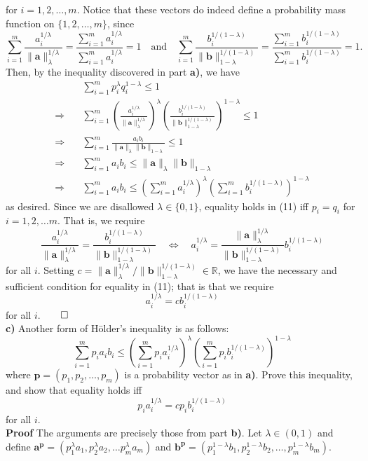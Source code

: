 \documentclass[11pt, letterpaper]{article}
\newcommand{\bs}[1]{\boldsymbol{#1}}
\newcommand{\mbb}[1]{\mathbb{#1}}
\begin{document}
for $i=1,2,\dots,m$. Notice that these vectors do indeed define a probability mass function on $\{1,2,\dots,m\}$, since
\[\sum_{i=1}^m\frac{a_i^{1/\lambda}}{\|\bs{a}\|_\lambda^{1/\lambda}}=\frac{\sum_{i=1}^ma_i^{1/\lambda}}{\sum_{i=1}^ma_i^{1/\lambda}}=1\quad\text{and}\quad\sum_{i=1}^m\frac{b_i^{1/(1-\lambda)}}{\|\bs{b}\|_{1-\lambda}^{1/(1-\lambda)}}=\frac{\sum_{i=1}^mb_i^{1/(1-\lambda)}}{\sum_{i=1}^mb_i^{1/(1-\lambda)}}=1.\]
Then, by the inequality discovered in part {\bf a)}, we have
\begin{align*}
    &\sum_{i=1}^mp_i^\lambda q_i^{1-\lambda}\leq 1\\
    \Rightarrow\quad&\sum_{i=1}^m\left(\frac{a_i^{1/\lambda}}{\|\bs{a}\|_\lambda^{1/\lambda}}\right)^\lambda\left(\frac{b_i^{1/(1-\lambda)}}{\|\bs{b}\|_{1-\lambda}^{1/(1-\lambda)}}\right)^{1-\lambda}\leq 1\\
    \Rightarrow\quad&\sum_{i=1}^m\frac{a_ib_i}{\|\bs{a}\|_\lambda\|\bs{b}\|_{1-\lambda}}\leq 1\\
    \Rightarrow\quad&\sum_{i=1}^ma_ib_i\leq\|\bs{a}\|_\lambda\|\bs{b}\|_{1-\lambda}\\
    \Rightarrow\quad&\sum_{i=1}^ma_ib_i\leq\left(\sum_{i=1}^ma_i^{1/\lambda}\right)^{\lambda}\left(\sum_{i=1}^mb_i^{1/(1-\lambda)}\right)^{1-\lambda}\tag{11}
\end{align*}
as desired. Since we are disallowed $\lambda\in\{0,1\}$, equality holds in (11) iff $p_i=q_i$ for $i=1,2,\dots m$. That is, we require
\[\frac{a_i^{1/\lambda}}{\|\bs{a}\|_\lambda^{1/\lambda}}=\frac{b_i^{1/(1-\lambda)}}{\|\bs{b}\|_{1-\lambda}^{1/(1-\lambda)}}\quad\Leftrightarrow\quad a_i^{1/\lambda}=\frac{\|\bs{a}\|_\lambda^{1/\lambda}}{\|\bs{b}\|_{1-\lambda}^{1/(1-\lambda)}}b_i^{1/(1-\lambda)}\]
for all $i$. Setting $c=\|\bs{a}\|_{\lambda}^{1/\lambda}/\|\bs{b}\|_{1-\lambda}^{1/(1-\lambda)}\in\mbb{R}$, we have the necessary and sufficient condition for equality in (11); that is that we require
\[a_i^{1/\lambda}=cb_i^{1/(1-\lambda)}\]
for all $i$.\hfill{$\qed$}\\[10pt]
{\bf c)} Another form of H\"older's inequality is as follows:
\[\sum_{i=1}^mp_ia_ib_i\leq\left(\sum_{i=1}^mp_ia_i^{1/\lambda}\right)^{\lambda}\left(\sum_{i=1}^mp_ib_i^{1/(1-\lambda)}\right)^{1-\lambda}\]
where $\bs{p}=(p_1,p_2,\dots,p_m)$ is a probability vector as in {\bf a)}. Prove this inequality, and show that equality holds iff
\[p_ia_i^{1/\lambda}=cp_ib_i^{1/(1-\lambda)}\]
for all $i$.\\[10pt]
{\bf Proof} The arguments are precisely those from part {\bf b)}. Let $\lambda\in(0,1)$ and define $\bs{a^p}=(p_1^\lambda a_1,p_2^\lambda a_2,\dots p_m^\lambda a_m)$ and $\bs{b^p}=(p_1^{1-\lambda}b_1,p_2^{1-\lambda}b_2,\dots,p_m^{1-\lambda}b_m)$.
\end{document}
